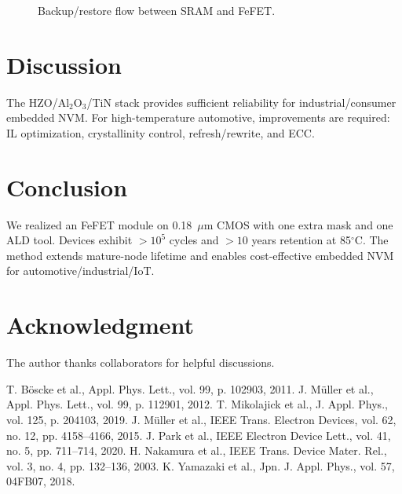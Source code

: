 \documentclass[conference]{IEEEtran}
\begin{document}
\begin{figure}[!t]
  \centering
  \caption{Backup/restore flow between SRAM and FeFET.}
  \label{fig:backup_flow}
\end{figure}

\section{Discussion}
The HZO/Al$_2$O$_3$/TiN stack provides sufficient reliability for industrial/consumer embedded NVM. 
For high-temperature automotive, improvements are required: IL optimization, crystallinity control, refresh/rewrite, and ECC.

\section{Conclusion}
We realized an FeFET module on 0.18~$\mu$m CMOS with one extra mask and one ALD tool. 
Devices exhibit $>10^5$ cycles and $>10$ years retention at 85$^\circ$C. 
The method extends mature-node lifetime and enables cost-effective embedded NVM for automotive/industrial/IoT.

\section*{Acknowledgment}
The author thanks collaborators for helpful discussions.

\begin{thebibliography}{1}
 T. Böscke et al., Appl. Phys. Lett., vol. 99, p. 102903, 2011.
 J. Müller et al., Appl. Phys. Lett., vol. 99, p. 112901, 2012.
 T. Mikolajick et al., J. Appl. Phys., vol. 125, p. 204103, 2019.
 J. Müller et al., IEEE Trans. Electron Devices, vol. 62, no. 12, pp. 4158–4166, 2015.
 J. Park et al., IEEE Electron Device Lett., vol. 41, no. 5, pp. 711–714, 2020.
 H. Nakamura et al., IEEE Trans. Device Mater. Rel., vol. 3, no. 4, pp. 132–136, 2003.
 K. Yamazaki et al., Jpn. J. Appl. Phys., vol. 57, 04FB07, 2018.
\end{thebibliography}
\end{document}

